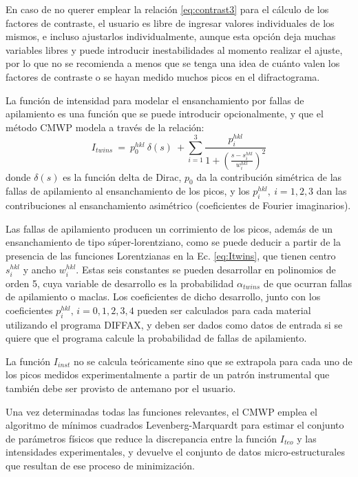En caso de no querer emplear la relación \ref{eq:contrast3} para el cálculo de los factores de contraste, el usuario es libre de ingresar valores individuales de los mismos, e incluso ajustarlos individualmente, aunque esta opción deja muchas variables libres y puede introducir inestabilidades al momento realizar el ajuste, por lo que no se recomienda a menos que se tenga una idea de cuánto valen los factores de contraste o se hayan medido muchos picos en el difractograma.

La función de intensidad para modelar el ensanchamiento por fallas de apilamiento es una función que se puede introducir opcionalmente, y que el método CMWP modela a través de la relación\cite{Ribarik2008}:
\begin{equation}
  I_{twins} \ = \ p_0^{hkl} \ \delta(s) \ + \sum_{i=1}^{3} \frac{p_{i}^{hkl}}{1+\left( \frac{s - s_i^{hkl}}{w_i^{hkl}} \right)^2}
  \label{eq:Itwins}
\end{equation}
\noindent
donde $\delta(s)$ es la función delta de Dirac, $p_0$ da la contribución simétrica de las fallas de apilamiento al ensanchamiento de los picos, y los $p_i^{hkl}, \ i=1,2,3$ dan las contribuciones al ensanchamiento asimétrico (coeficientes de Fourier imaginarios).

Las fallas de apilamiento producen un corrimiento de los picos, además de un ensanchamiento de tipo súper-lorentziano, como se puede deducir a partir de la presencia de las funciones Lorentzianas en la Ec. \ref{eq:Itwins}, que tienen centro $s_i^{hkl}$ y ancho $w_i^{hkl}$.
Estas seis constantes se pueden desarrollar en polinomios de orden 5, cuya variable de desarrollo es la probabilidad $\alpha_{twins}$ de que ocurran fallas de apilamiento o maclas\cite{Ribarik2008}.
Los coeficientes de dicho desarrollo, junto con los coeficientes $p_i^{hkl},\,i=0,1,2,3,4$ pueden ser calculados para cada material utilizando el programa DIFFAX\cite{Treacy1991}, y deben ser dados como datos de entrada si se quiere que el programa calcule la probabilidad de fallas de apilamiento.

La función $I_{inst}$ no se calcula teóricamente sino que se extrapola para cada uno de los picos medidos experimentalmente a partir de un patrón instrumental que también debe ser provisto de antemano por el usuario.

Una vez determinadas todas las funciones relevantes, el CMWP emplea el algoritmo de mínimos cuadrados Levenberg-Marquardt para estimar el conjunto de parámetros físicos que reduce la discrepancia entre la función $I_{teo}$ y las intensidades experimentales, y devuelve el conjunto de datos micro-estructurales que resultan de ese proceso de minimización.

